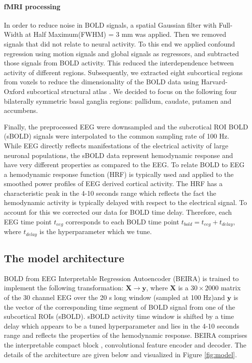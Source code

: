 \documentclass{article}
\begin{document}
\paragraph{fMRI processing} 
In order to reduce noise in BOLD signals, a spatial Gaussian filter  with Full-Width at Half Maximum(FWHM) = 3 mm was applied. Then we removed signals that did not relate to neural activity. To this end we applied confound regression using motion signals and global signals as regressors, and subtracted those signals from BOLD activity. This reduced the interdependence between activity of different regions. Subsequently, we extracted eight subcortical regions from voxels to reduce the dimensionality of the BOLD data using Harvard-Oxford subcortical structural atlas \cite{oxford_atlas}.  We decided to focus on the following four bilaterally symmetric basal ganglia regions: pallidum, caudate, putamen and accumbens.

Finally, the preprocessed EEG were downsampled and the subcrotical ROI BOLD (sBOLD) signals were interpolated to the common sampling rate of 100 Hz. While EEG directly reflects manifestations of the electrical activity of large neuronal populations, the sBOLD data represent hemodynamic response and have very different properties as compared to the EEG. To relate BOLD to EEG a hemodynamic response function (HRF) \cite{hrf_bold} is typically used and applied to the smoothed power profiles of EEG derived cortical activity. The HRF has a characteristic peak in the 4-10 seconds range which reflects the fact the hemodynamic activity is typically delayed with respect to the electrical signal. To account for this we corrected our data for BOLD time delay. Therefore, each EEG time point $t_{eeg}$ corresponds to each BOLD time point $t_{bold} = t_{eeg} + t_{delay}$, where $t_{delay}$ is the hyperparameter which we tune. 


\subsection{The model architecture}

BOLD from EEG Interpretable Regression Autoencoder (BEIRA) is trained to implement the following transformation: $\mathbf{X} \rightarrow \mathbf{y}$, where $\mathbf{X}$ is a $30 \times 2000$ matrix of the 30 channel EEG over the 20 s long window (sampled at 100 Hz)and $\mathbf{y}$ is the vector of the corresponding time segment of BOLD signal from one of the subcortical ROIs (sBOLD). sBOLD activity time window is shifted by a time delay which appears to be a tuned hyperparameter and lies in the 4-10 seconds range and reflects the properties of the hemodynamic response. BEIRA comprises the interpretable compact block  \cite{petrosyan2021decoding}, convolutional feature encoder and decoder. The details of the architecture are given below and visualized in Figure \ref{fig:model}.
\end{document}
